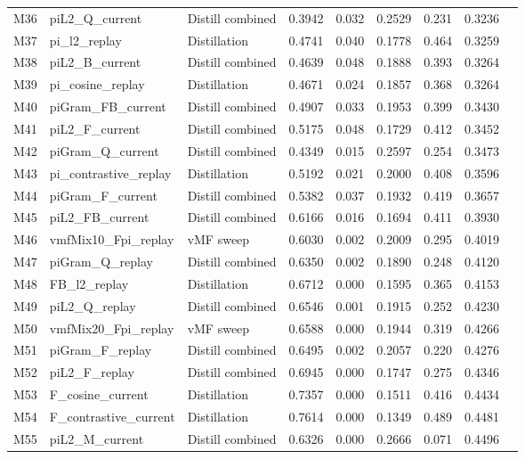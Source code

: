 \documentclass[11pt,a4paper]{article}
\begin{document}
\begin{small}
\begin{longtable}{llp{3cm}rrrrrr}
    M36 & piL2\_Q\_current & Distill combined & 0.3942 & 0.032 & 0.2529 & 0.231 & 0.3236 \\
    M37 & pi\_l2\_replay & Distillation & 0.4741 & 0.040 & 0.1778 & 0.464 & 0.3259 \\
    M38 & piL2\_B\_current & Distill combined & 0.4639 & 0.048 & 0.1888 & 0.393 & 0.3264 \\
    M39 & pi\_cosine\_replay & Distillation & 0.4671 & 0.024 & 0.1857 & 0.368 & 0.3264 \\
    M40 & piGram\_FB\_current & Distill combined & 0.4907 & 0.033 & 0.1953 & 0.399 & 0.3430 \\
    M41 & piL2\_F\_current & Distill combined & 0.5175 & 0.048 & 0.1729 & 0.412 & 0.3452 \\
    M42 & piGram\_Q\_current & Distill combined & 0.4349 & 0.015 & 0.2597 & 0.254 & 0.3473 \\
    M43 & pi\_contrastive\_replay & Distillation & 0.5192 & 0.021 & 0.2000 & 0.408 & 0.3596 \\
    M44 & piGram\_F\_current & Distill combined & 0.5382 & 0.037 & 0.1932 & 0.419 & 0.3657 \\
    M45 & piL2\_FB\_current & Distill combined & 0.6166 & 0.016 & 0.1694 & 0.411 & 0.3930 \\
    M46 & vmfMix10\_Fpi\_replay & vMF sweep & 0.6030 & 0.002 & 0.2009 & 0.295 & 0.4019 \\
    M47 & piGram\_Q\_replay & Distill combined & 0.6350 & 0.002 & 0.1890 & 0.248 & 0.4120 \\
    M48 & FB\_l2\_replay & Distillation & 0.6712 & 0.000 & 0.1595 & 0.365 & 0.4153 \\
    M49 & piL2\_Q\_replay & Distill combined & 0.6546 & 0.001 & 0.1915 & 0.252 & 0.4230 \\
    M50 & vmfMix20\_Fpi\_replay & vMF sweep & 0.6588 & 0.000 & 0.1944 & 0.319 & 0.4266 \\
    M51 & piGram\_F\_replay & Distill combined & 0.6495 & 0.002 & 0.2057 & 0.220 & 0.4276 \\
    M52 & piL2\_F\_replay & Distill combined & 0.6945 & 0.000 & 0.1747 & 0.275 & 0.4346 \\
    M53 & F\_cosine\_current & Distillation & 0.7357 & 0.000 & 0.1511 & 0.416 & 0.4434 \\
    M54 & F\_contrastive\_current & Distillation & 0.7614 & 0.000 & 0.1349 & 0.489 & 0.4481 \\
    M55 & piL2\_M\_current & Distill combined & 0.6326 & 0.000 & 0.2666 & 0.071 & 0.4496 \\

\end{longtable}
\end{small}
\end{document}
